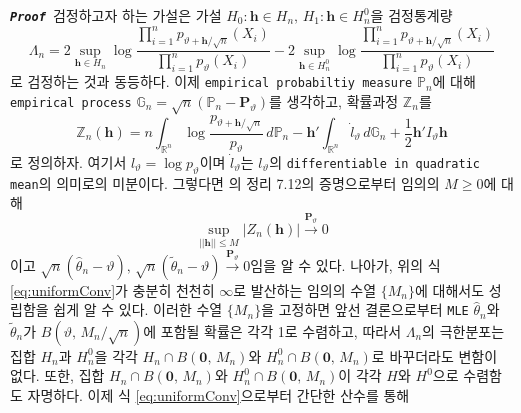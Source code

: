 \documentclass[11pt,onecolumn,twoside,a4size]{gsag3jnl}
\newcommand{\proof}{\texttt{\textit{\textbf{Proof }}}}
\begin{document}
\proof 검정하고자 하는 가설은 가설 $H_0:\mathbf{h}\in H_n,\,H_1:\mathbf{h}\in H_n^0$을 검정통계량
\begin{equation}
  \Lambda_n=2\sup_{\mathbf{h}\in H_n}\log\frac{\prod_{i=1}^np_{\vartheta+\mathbf{h}/\sqrt{n}}(X_i)}{\prod_{i=1}^np_{\vartheta}(X_i)}-2\sup_{\mathbf{h}\in H_n^0}\log\frac{\prod_{i=1}^np_{\vartheta+\mathbf{h}/\sqrt{n}}(X_i)}{\prod_{i=1}^np_{\vartheta}(X_i)}
\end{equation}
로 검정하는 것과 동등하다. 이제 \texttt{empirical probabiltiy measure} $\mathbb{P}_n$에 대해 \texttt{empirical process} $\mathbb{G}_n=\sqrt{n}(\mathbb{P}_n-\mathbf{P}_\vartheta)$를 생각하고, 확률과정 $\mathbb{Z}_n$를
\begin{equation}
  \mathbb{Z}_n(\mathbf{h})=n\int_{\mathbb{R}^n}\log\frac{p_{\vartheta+\mathbf{h}/\sqrt{n}}}{p_{\vartheta}}\,d\mathbb{P}_n-\mathbf{h}'\int_{\mathbb{R}^n}\dot{l}_\vartheta\,d\mathbb{G}_n+\frac{1}{2}\mathbf{h}'I_\vartheta\mathbf{h}
\end{equation}
로 정의하자. 여기서 $l_\vartheta=\log p_\vartheta$이며 $\dot{l}_\vartheta$는 $l_\vartheta$의 \texttt{differentiable in quadratic mean}의 의미로의 미분이다. 그렇다면 \texttt{\cite{van2000asymptotic}}의 정리 7.12의 증명으로부터 임의의 $M\geq0$에 대해
\begin{equation}\label{eq:uniformConv}
  \sup_{||\mathbf{h}||\leq M}|Z_n(\mathbf{h})|\stackrel{\mathbf{P}_\vartheta}{\to}0
\end{equation}이고 $\sqrt{n}(\widehat{\theta}_n-\vartheta),\,\sqrt{n}(\widetilde{\theta}_n-\vartheta)\stackrel{\mathbf{P}_\vartheta}{\to}0$임을 알 수 있다. 나아가, 위의 식 \ref{eq:uniformConv}가 충분히 천천히 $\infty$로 발산하는 임의의 수열 $\{M_n\}$에 대해서도 성립함을 쉽게 알 수 있다. 이러한 수열 $\{M_n\}$을 고정하면 앞선 결론으로부터 \texttt{MLE} $\widehat{\theta}_n$와 $\widetilde{\theta}_n$가 $B(\vartheta,\,M_n/\sqrt{n})$에 포함될 확률은 각각 1로 수렴하고, 따라서 $\Lambda_n$의 극한분포는 집합 $H_n$과 $H_n^0$을 각각 $H_n\cap B(\mathbf{0},\,M_n)$와 $H_n^0\cap B(\mathbf{0},\,M_n)$로 바꾸더라도 변함이 없다. 또한, 집합 $H_n\cap B(\mathbf{0},\,M_n)$와 $H_n^0\cap B(\mathbf{0},\,M_n)$이 각각 $H$와 $H^0$으로 수렴함도 자명하다. 이제 식 \ref{eq:uniformConv}으로부터 간단한 산수를 통해
\end{document}
